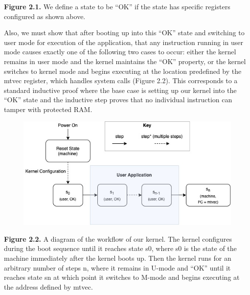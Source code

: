 \documentclass[]{article}
\begin{document}
\textbf{Figure 2.1.} We define a state to be ``OK'' if the state has
specific registers configured as shown above.

Also, we must show that after booting up into this ``OK'' state and
switching to user mode for execution of the application, that any
instruction running in user mode causes exactly one of the following two
cases to occur: either the kernel remains in user mode and the kernel
maintains the ``OK'' property, or the kernel switches to kernel mode and
begins executing at the location predefined by the mtvec register, which
handles system calls (Figure 2.2). This corresponds to a standard
inductive proof where the base case is setting up our kernel into the
``OK'' state and the inductive step proves that no individual
instruction can tamper with protected RAM.

\begin{figure}
\centering
\includegraphics{Proof-Diagram.jpg}
\caption{}
\end{figure}

\textbf{Figure 2.2.} A diagram of the workflow of our kernel. The kernel
configures during the boot sequence until it reaches state s0, where s0
is the state of the machine immediately after the kernel boots up. Then
the kernel runs for an arbitrary number of steps n, where it remains in
U-mode and ``OK'' until it reaches state sn at which point it switches
to M-mode and begins executing at the address defined by mtvec.
\end{document}
